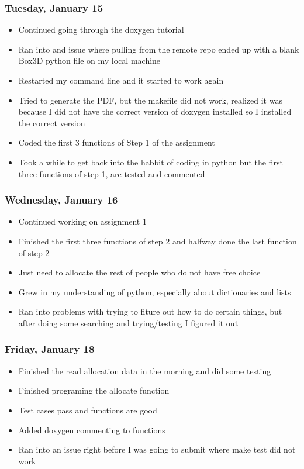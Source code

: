 \documentclass{article}
\begin{document}
\subsubsection{Tuesday, January 15}
\begin{itemize}
    \item Continued going through the doxygen tutorial
    \item Ran into and issue where pulling from the remote repo ended up with a blank Box3D python file on my local machine
    \item Restarted my command line and it started to work again
    \item Tried to generate the PDF, but the makefile did not work, realized it was because I did not have the correct version of doxygen installed so I installed the correct version
    \item Coded the first 3 functions of Step 1 of the assignment
    \item Took a while to get back into the habbit of coding in python but the first three functions of step 1, are tested and commented
\end{itemize}

\subsubsection{Wednesday, January 16}
\begin{itemize}
    \item Continued working on assignment 1\
    \item Finished the first three functions of step 2 and halfway done the last function of step 2
    \item Just need to allocate the rest of people who do not have free choice
    \item Grew in my understanding of python, especially about dictionaries and lists
    \item Ran into problems with trying to fiture out how to do certain things, but after doing some searching and trying/testing I figured it out
\end{itemize}

\subsubsection{Friday, January 18}
\begin{itemize}
    \item Finished the read allocation data in the morning and did some testing
    \item Finished programing the allocate function
    \item Test cases pass and functions are good
    \item Added doxygen commenting to functions
    \item Ran into an issue right before I was going to submit where make test did not work
\end{itemize}
\end{document}
